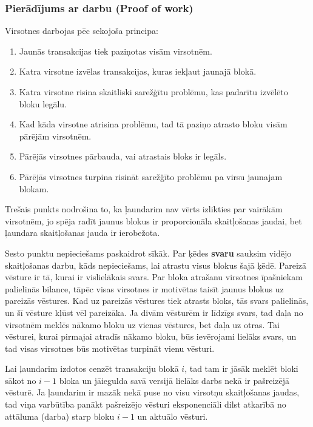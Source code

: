 \subsubsection{Pierādījums ar darbu (Proof of work)}
Virsotnes darbojas pēc sekojoša principa:\cite{nakamoto08}
\begin{enumerate}
    \item Jaunās transakcijas tiek paziņotas visām virsotnēm.
    \item Katra virsotne izvēlas transakcijas, kuras iekļaut jaunajā blokā.
    \item Katra virsotne risina skaitliski sarežģītu problēmu, kas padarītu izvēlēto bloku legālu.
    \item Kad kāda virsotne atrisina problēmu, tad tā paziņo atrasto bloku visām pārējām virsotnēm.
    \item Pārējās virsotnes pārbauda, vai atrastais bloks ir legāls.
    \item Pārējās virsotnes turpina risināt sarežģīto problēmu pa virsu jaunajam blokam.
\end{enumerate}
Trešais punkts nodrošina to, ka ļaundarim nav vērts izlikties par vairākām virsotnēm, jo spēja radīt jaunus blokus ir proporcionāla skaitļošanas jaudai, bet ļaundara skaitļošanas jauda ir ierobežota.

Sesto punktu nepieciešams paskaidrot sīkāk. Par ķēdes \textbf{svaru} sauksim vidējo skaitļošanas darbu, kāds nepieciešams, lai atrastu visus blokus šajā ķēdē. Pareizā vēsture ir tā, kurai ir vislielākais svars. Par bloka atrašanu virsotnes īpašniekam palielinās bilance, tāpēc visas virsotnes ir motivētas taisīt jaunus blokus uz pareizās vēstures. Kad uz pareizās vēstures tiek atrasts bloks, tās svars palielinās, un šī vēsture kļūst vēl pareizāka. Ja divām vēsturēm ir līdzīgs svars, tad daļa no virsotnēm meklēs nākamo bloku uz vienas vēstures, bet daļa uz otras. Tai vēsturei, kurai pirmajai atradīs nākamo bloku, būs ievērojami lielāks svars, un tad visas virsotnes būs motivētas turpināt vienu vēsturi.

Lai ļaundarim izdotos cenzēt transakciju blokā $i$, tad tam ir jāsāk meklēt bloki sākot no $i-1$ bloka un jāiegulda savā versijā lielāks darbs nekā ir pašreizējā vēsturē. Ja ļaundarim ir mazāk nekā puse no visu virsotņu skaitļošanas jaudas, tad viņa varbūtība panākt pašreizējo vēsturi eksponenciāli dilst atkarībā no attāluma (darba) starp bloku $i-1$ un aktuālo vēsturi.\cite{nakamoto08}

